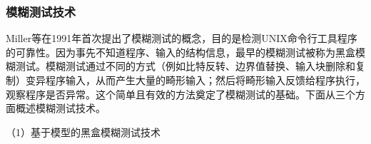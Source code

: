%
%
%
%
%

\subsubsection{模糊测试技术}

Miller等在1991年首次提出了模糊测试的概念，目的是检测UNIX命令行工具程序的可靠性。因为事先不知道程序、输入的结构信息，最早的模糊测试被称为黑盒模糊测试。模糊测试通过不同的方式（例如比特反转、边界值替换、输入块删除和复制）变异程序输入，从而产生大量的畸形输入；然后将畸形输入反馈给程序执行，观察程序是否异常。这个简单且有效的方法奠定了模糊测试的基础。下面从三个方面概述模糊测试技术。

（1）基于模型的黑盒模糊测试技术

